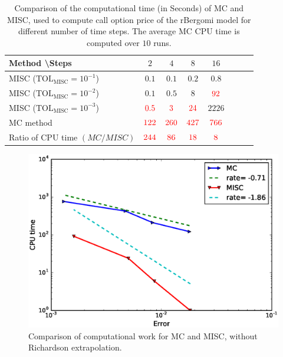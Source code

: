 \FloatBarrier
\begin{table}[h!]
	\centering
	\begin{tabular}{l*{6}{c}r}
		Method \textbackslash  Steps            & $2$ & $4$ & $8$ & $16$ &   \\
		\hline
		MISC ($\text{TOL}_{\text{MISC}}=10^{-1}$)  & $0.1$ & $0.1$ & $0.2$ & $0.8$ \\
		MISC ($\text{TOL}_{\text{MISC}}=10^{-2}$)  & $0.1$ & $0.5$ & $8$ & $\red{92}$ \\
		MISC ($\text{TOL}_{\text{MISC}}=10^{-3}$)  & $\red{0.5}$ & $\red{3}$ & $\red{24}$ & $2226$ \\
		\hline
		MC method   & $ \red{122}
		
		$  & $  \red{260}$  & $  \red{427}$ & $ \red{766}
		$  \\	
		\hline
		Ratio of CPU time  $\left(MC/MISC \right)$ & $ \red{244}
		
		$  & $  \red{86}$  & $  \red{  18
		}$ & $ \red{ 8}
		$  \\	
		
		\hline
	\end{tabular}
	\caption{Comparison of the computational time (in Seconds) of  MC and MISC, used to compute call option price of the rBergomi model for different number of time steps. The average  MC CPU time is computed over $10$ runs. }
	\label{Comparsion of the computational time of  MC and MISC, used to compute Call option price of rBergomi model for different number of time steps. Case set3}
\end{table}
\FloatBarrier
	\begin{figure}[h!]
	\centering
	\includegraphics[width=0.5\linewidth]{./figures/rBergomi_Complexity_rates/set5/error_vs_time_set5}

	\caption{Comparison of computational work  for MC and MISC, without Richardson extrapolation.}
	\label{fig:Complexity plot for MC and MISC for Case set $3$ parameters}
\end{figure}



